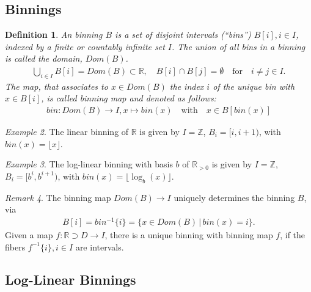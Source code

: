 \documentclass{article}
\theoremstyle{plain}
\newtheorem{definition}{Definition}[section]
\theoremstyle{remark}
\newtheorem{remark}[definition]{Remark}
\newtheorem{example}[definition]{Example}
\newcommand{\IR}{\mathbb{R}}
\newcommand{\IZ}{\mathbb{Z}}
\newcommand{\Union}{\bigcup}
\newcommand{\defn}{\emph} %
\newcommand{\qtext}[1]{\quad\text{#1}\quad} %
\newcommand{\lra}{\longrightarrow}
\newcommand{\floor}[1]{\lfloor#1\rfloor}
\begin{document}
\subsection{Binnings}

\begin{definition}
  An binning $B$ is a set of disjoint intervals (``bins'') $B[i], i\in I$, indexed by a
  finite or countably infinite set $I$.
  The union of all bins in a binning is called the domain, $Dom(B)$.
  \begin{align*}
    \Union_{i \in I} B[i] = Dom(B) \subset \IR,\quad B[i] \cap B[j] = \emptyset \qtext{for} i \neq j \in I.
  \end{align*}
  The map, that associates to $x \in Dom(B)$ the index $i$ of the unique bin with $x \in B[i]$,
  is called \defn{binning map}
  and denoted as follows:
  \begin{align*}
    bin: Dom(B) \lra I, x \mapsto bin(x) \qtext{with} x \in B[bin(x)]
  \end{align*}
\end{definition}

\begin{example}
  The linear binning of $\IR$ is given by $I = \IZ$, $B_i = [i, i+1)$, with $bin(x)=\floor{x}$.
\end{example}

\begin{example}
  The log-linear binning with basis $b$ of $\IR_{>0}$ is given by $I=\IZ$, $B_i = [b^i, b^{i+1})$, with $bin(x)=\floor{\log_b(x)}$.
\end{example}

\begin{remark}
  The binning map $Dom(B) \lra I$ uniquely determines the binning $B$, via
  \begin{align*}
    B[i] = bin^{-1}\{ i \} = \{ x \in Dom(B) \,|\, bin(x) = i \}.
  \end{align*}
  Given a map $f:\IR \supset D \lra I$, there is a unique binning with binning map $f$, if the fibers $f^{-1}\{i\}, i \in I$ are intervals.
\end{remark}

\subsection{Log-Linear Binnings}
\end{document}
